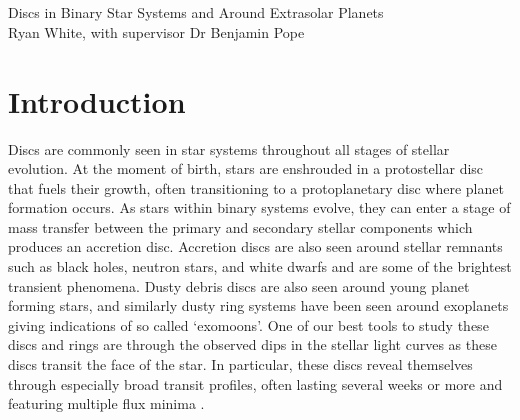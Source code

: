 \documentclass{article}
\begin{document}
\\\\
{\large Discs in Binary Star Systems and Around Extrasolar Planets}\\
{\large Ryan White, with supervisor Dr Benjamin Pope}\\

\section{Introduction}
Discs are commonly seen in star systems throughout all stages of stellar evolution. At the moment of birth, stars are enshrouded in a protostellar disc that fuels their growth, often transitioning to a protoplanetary disc where planet formation occurs. As stars within binary systems evolve, they can enter a stage of mass transfer between the primary and secondary stellar components which produces an accretion disc. Accretion discs are also seen around stellar remnants such as black holes, neutron stars, and white dwarfs and are some of the brightest transient phenomena. Dusty debris discs are also seen around young planet forming stars, and similarly dusty ring systems have been seen around exoplanets giving indications of so called `exomoons'. One of our best tools to study these discs and rings are through the observed dips in the stellar light curves as these discs transit the face of the star. In particular, these discs reveal themselves through especially broad transit profiles, often lasting several weeks or more and featuring multiple flux minima \citep{Hoard2010ApJ, Mamajek2012AJ, Bernhard2024arXiv}.

\end{document}
